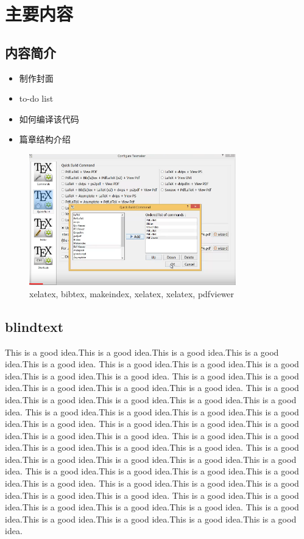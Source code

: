 
\chapter{主要内容}

\section{内容简介}

\begin{itemize}
	\item 制作封面
	\item to-do list
	\item 如何编译该代码
	\item 篇章结构介绍
\end{itemize}

\begin{figure}[!h]
	\includegraphics[width=0.8\textwidth]{figures/compiler_set.png}
	\caption{xelatex, bibtex, makeindex, xelatex, xelatex, pdfviewer}
\end{figure}


\section{blindtext}

\blindtext %


This is a good idea.This is a good idea.This is a good idea.This is a good idea.This is a good idea.
This is a good idea.This is a good idea.This is a good idea.This is a good idea.This is a good idea.
This is a good idea.This is a good idea.This is a good idea.This is a good idea.This is a good idea.
This is a good idea.This is a good idea.This is a good idea.This is a good idea.This is a good idea.
This is a good idea.This is a good idea.This is a good idea.This is a good idea.This is a good idea.
This is a good idea.This is a good idea.This is a good idea.This is a good idea.This is a good idea.
This is a good idea.This is a good idea.This is a good idea.This is a good idea.This is a good idea.
This is a good idea.This is a good idea.This is a good idea.This is a good idea.This is a good idea.
This is a good idea.This is a good idea.This is a good idea.This is a good idea.This is a good idea.
This is a good idea.This is a good idea.This is a good idea.This is a good idea.This is a good idea.
This is a good idea.This is a good idea.This is a good idea.This is a good idea.This is a good idea.
This is a good idea.This is a good idea.This is a good idea.This is a good idea.This is a good idea.